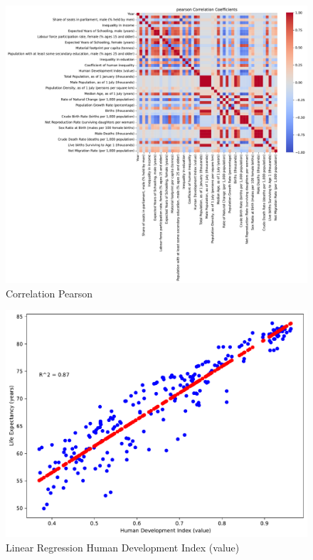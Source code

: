 \documentclass[a4paper]{article}
\begin{document}
\begin{figure}[H]
  \begin{center}
    \includegraphics[width=\textwidth]{ola/pearson_correlation.pdf}
    \caption{Correlation Pearson}
    \label{fig:pearson_correlation}
  \end{center}
\end{figure}

\begin{figure}[H]
  \begin{center}
    \includegraphics[width=\textwidth]{ola/_linear_regression_human_development_index_(value).pdf}
    \caption{Linear Regression Human Development Index (value)}
    \label{fig:reg_human_development_index}
  \end{center}
\end{figure}
\end{document}
